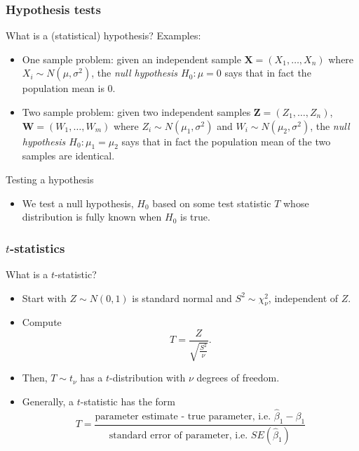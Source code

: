 \documentclass[handout]{beamer}
\begin{document}
   \begin{frame} \frametitle{Hypothesis tests}

   \begin{block}
   {What is a (statistical) hypothesis?}
   Examples:
   \begin{itemize}[<+->]
   \item One sample problem: given an independent sample $\pmb{X}=(X_1, \dots, X_n)$ where $X_i\sim N(\mu,\sigma^2)$, the {\em null hypothesis $H_0:\mu=0$} says that in fact the population mean is 0.

   \item Two sample problem: given two independent samples $\pmb{Z}=(Z_1, \dots, Z_n)$, $\pmb{W}=(W_1, \dots, W_m)$  where $Z_i\sim N(\mu_1,\sigma^2)$ and $W_i \sim N(\mu_2, \sigma^2)$, the {\em null hypothesis $H_0:\mu_1=\mu_2$} says that in fact the population mean of the two samples are identical.
   \end{itemize}
   \end{block}
   \begin{block}
   {Testing a hypothesis}
   \begin{itemize}
   \item We test a null hypothesis, $H_0$ based on some test statistic $T$ whose distribution is fully known when $H_0$ is true.
   \end{itemize}
   \end{block}
   \end{frame}


   \begin{frame} \frametitle{$t$-statistics}

   \begin{block}    {What is a $t$-statistic?}

   \begin{itemize}
   \item Start with $Z \sim N(0,1)$ is standard normal and $S^2 \sim \chi^2_{\nu}$, independent of $Z$.
   \item Compute
   $$
   T = \frac{Z}{\sqrt{\frac{S^2}{\nu}}}.$$

   \item Then,  $T \sim t_{\nu}$ has a $t$-distribution with $\nu$ degrees of freedom.


   \item Generally, a $t$-statistic has the form
   $$
   T = \frac{\text{parameter estimate - true parameter, i.e. $\widehat{\beta}_1-\beta_1$}}{\text{standard error of parameter, i.e. $SE(\widehat{\beta}_1)$}}$$
   \end{itemize}
   \end{block}
   \end{frame}
\end{document}
